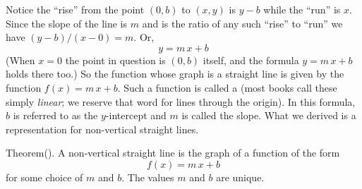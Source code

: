Notice the ``rise'' from the point $(0,b)$ to $(x,y)$ is $y - b$ while the
``run'' is $x$. Since the slope of the line is $m$ and is the ratio of any 
such ``rise'' to ``run'' we have $(y - b) / (x - 0) = m$. Or,
$$
y = m\, x + b
$$
(When $x = 0$ the point in question is $(0,b)$ itself, and the formula
$y = m\,x + b$ holds there too.)
So the function whose graph is a straight line is given by the function
$f(x) = m\, x + b$. Such
a function is called a {\it {}\/} (most books
call these simply {\it linear\/}; we reserve that word for lines through
the origin).
In this formula, $b$ is referred to as the $y$-intercept and $m$ is called the slope.
What we derived is a representation for non-vertical straight lines.

\filbreak

\proclaim Theorem(). A non-vertical straight line is the graph of a function
of the form 
$$
f(x) = m\, x + b
$$
for some choice of $m$ and $b$. The values $m$ and $b$ are unique. 
\par
